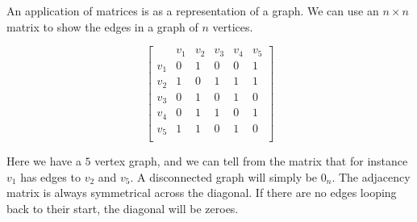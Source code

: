 \documentclass[12pt]{report}
\begin{document}
\begin{flushleft}
An application of matrices is as a representation of a graph. We can use an
\(n \times n\) matrix to show the edges in a graph of \(n\) vertices.

\[
    \left[\begin{array}{c|ccccc}
        & v_1 & v_2 & v_3 & v_4 & v_5 \\
        \hline
        v_1 & 0 & 1 & 0 & 0 & 1 \\
        v_2 & 1 & 0 & 1 & 1 & 1 \\
        v_3 & 0 & 1 & 0 & 1 & 0 \\
        v_4 & 0 & 1 & 1 & 0 & 1 \\
        v_5 & 1 & 1 & 0 & 1 & 0 \\
    \end{array}\right]
\]

Here we have a \(5\) vertex graph, and we can tell from the matrix that for
instance \(v_1\) has edges to \(v_2\) and \(v_5\). A disconnected graph will
simply be \(0_n\). The adjacency matrix is always symmetrical across the
diagonal. If there are no edges looping back to their start, the diagonal will
be zeroes.

\end{flushleft}
\end{document}
